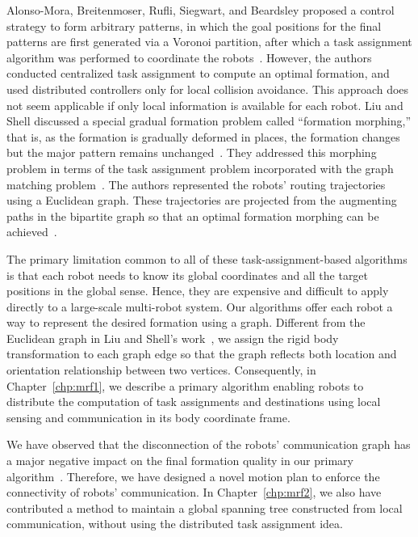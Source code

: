 Alonso-Mora, Breitenmoser, Rufli, Siegwart, and Beardsley proposed a control
strategy to form arbitrary patterns, in which the goal positions for the final
patterns are first generated via a Voronoi partition, after which a task
assignment algorithm was performed to coordinate the robots~\cite{AloBreRufSieBea11}. 
%
However, the authors conducted centralized task assignment to compute an optimal formation, and used distributed controllers only for local collision avoidance.  
%
This approach does not seem applicable if only local information is available for each robot.  
%
Liu and Shell discussed a special gradual formation problem called ``formation morphing,'' 
that is, as the formation is gradually deformed in places, the formation changes but the major
pattern remains unchanged~\cite{LiuShe12}. 
%
They addressed this morphing problem in terms of the task assignment problem incorporated with the graph matching problem~\cite{Lov86}. 
%
The authors represented the robots' routing trajectories using a Euclidean graph.  
%
These trajectories are projected from the augmenting paths in the bipartite graph 
so that an optimal formation morphing can be achieved~\cite{LiuShe12}.

The primary limitation common to all of these task-assignment-based algorithms
is that each robot needs to know its global coordinates and all the target
positions in the global sense. 
%
Hence, they are expensive and difficult to apply directly to a large-scale multi-robot system. 
%
Our algorithms offer each robot a way to represent the desired formation using a graph.
%
Different from the Euclidean graph in Liu and Shell's work~\cite{LiuShe12},
we assign the rigid body transformation to each graph edge so that the graph
reflects both location and orientation relationship between two vertices. 
%
Consequently, in Chapter~\ref{chp:mrf1}, we describe a primary algorithm enabling robots to
distribute the computation of task assignments and destinations using local sensing
and communication in its body coordinate frame.


We have observed that the disconnection of the robots' communication
graph has a major negative impact on the final formation quality in our
primary algorithm~\cite{SonOKa14}. 
%
Therefore, we have designed a novel motion plan to enforce the connectivity of robots' communication.
%
In Chapter~\ref{chp:mrf2}, we also have contributed a method to maintain a global
spanning tree constructed from local communication, 
without using the distributed task assignment idea.


